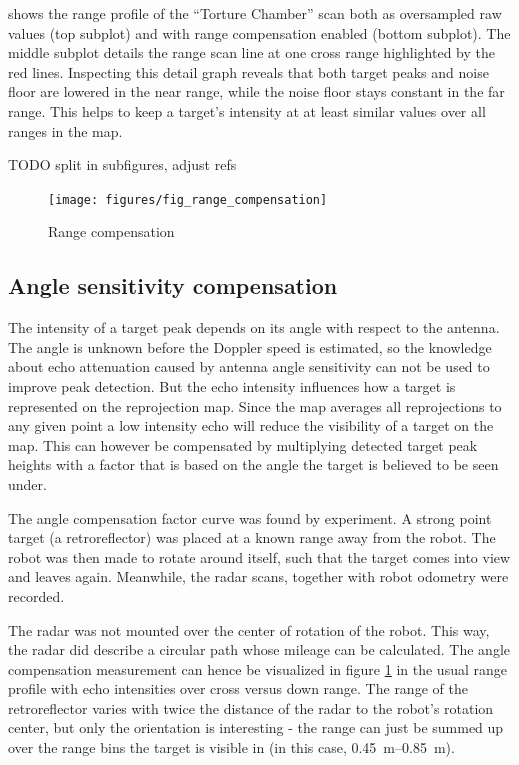  shows the range profile of the ``Torture Chamber'' scan
both as oversampled raw values (top subplot) and with range compensation
enabled (bottom subplot). The middle subplot details the range scan line
at one cross range highlighted by the red lines. Inspecting this detail
graph reveals that both target peaks and noise floor are lowered in the
near range, while the noise floor stays constant in the far range. This
helps to keep a target's intensity at at least similar values over all
ranges in the map.

TODO split in subfigures, adjust refs
\begin{figure}[htbp]
    \centering
    \texttt{[image: figures/fig\_range\_compensation]}
    \caption{Range compensation}
    \label{fig:fig_range_compensation}
\end{figure}

\subsection{Angle sensitivity compensation}\label{angle-sensitivity-compensation}

The intensity of a target peak depends on its angle with respect to the
antenna. The angle is unknown before the Doppler speed is estimated, so
the knowledge about echo attenuation caused by antenna angle sensitivity
can not be used to improve peak detection. But the echo intensity
influences how a target is represented on the reprojection map. Since
the map averages all reprojections to any given point a low intensity
echo will reduce the visibility of a target on the map. This can however
be compensated by multiplying detected target peak heights with a factor
that is based on the angle the target is believed to be seen under.

The angle compensation factor curve was found by experiment. A strong
point target (a retroreflector) was placed at a known range away from
the robot. The robot was then made to rotate around itself, such that
the target comes into view and leaves again. Meanwhile, the radar scans,
together with robot odometry were recorded.

The radar was not mounted over the center of rotation of the robot. This
way, the radar did describe a circular path whose mileage can be
calculated. The angle compensation measurement can hence be visualized
in figure \cref{fig:fig_range_compensation} in the usual range profile with echo intensities over
cross versus down range. The range of the retroreflector varies with
twice the distance of the radar to the robot's rotation center, but only
the orientation is interesting - the range can just be summed up over
the range bins the target is visible in (in this case,
\SIrange{0.45}{0.85}{m}).

